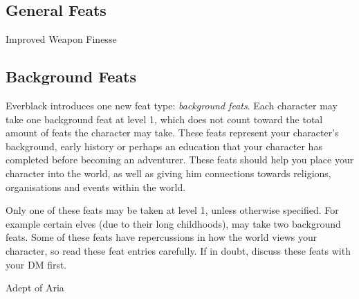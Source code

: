 \subsection{General Feats}
\label{sec:General Feats}

\begin{35efeat}{Improved Weapon Finesse}
\end{35efeat}

\subsection{Background Feats}
\label{sec:Background Feats}

Everblack introduces one new feat type: \emph{background feats}. Each character
may take one background feat at level 1, which does not count toward the total
amount of feats the character may take. These feats represent your character's
background, early history or perhaps an education that your character has
completed before becoming an adventurer. These feats should help you place your
character into the world, as well as giving him connections towards religions,
organisations and events within the world.

Only one of these feats may be taken at level 1, unless otherwise specified.
For example certain elves (due to their long childhoods), may take two
background feats. Some of these feats have repercussions in how the world
views your character, so read these feat entries carefully. If in doubt,
discuss these feats with your DM first.

\begin{35efeat}{Adept of Aria}
  \srdbackgroundfeat
\end{35efeat}

